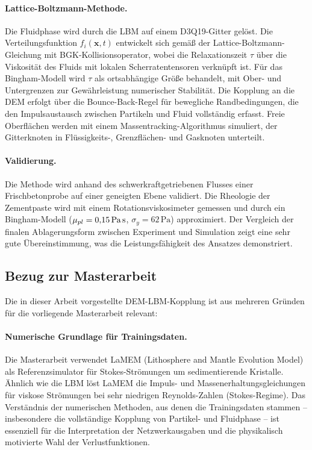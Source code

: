 \documentclass[a4paper,12pt]{article}
\begin{document}
\paragraph{Lattice-Boltzmann-Methode.}
Die Fluidphase wird durch die LBM auf einem D3Q19-Gitter gelöst. Die Verteilungsfunktion $f_i(\mathbf{x}, t)$ entwickelt sich gemäß der Lattice-Boltzmann-Gleichung mit BGK-Kollisionsoperator, wobei die Relaxationszeit $\tau$ über die Viskosität des Fluids mit lokalen Scherratentensoren verknüpft ist. Für das Bingham-Modell wird $\tau$ als ortsabhängige Größe behandelt, mit Ober- und Untergrenzen zur Gewährleistung numerischer Stabilität. Die Kopplung an die DEM erfolgt über die Bounce-Back-Regel für bewegliche Randbedingungen, die den Impulsaustausch zwischen Partikeln und Fluid vollständig erfasst. Freie Oberflächen werden mit einem Massentracking-Algorithmus simuliert, der Gitterknoten in Flüssigkeits-, Grenzflächen- und Gasknoten unterteilt.

\paragraph{Validierung.}
Die Methode wird anhand des schwerkraftgetriebenen Flusses einer Frischbetonprobe auf einer geneigten Ebene validiert. Die Rheologie der Zementpaste wird mit einem Rotationsviskosimeter gemessen und durch ein Bingham-Modell ($\mu_{pl} = 0{,}15\,\text{Pa\,s}$, $\sigma_y = 62\,\text{Pa}$) approximiert. Der Vergleich der finalen Ablagerungsform zwischen Experiment und Simulation zeigt eine sehr gute Übereinstimmung, was die Leistungsfähigkeit des Ansatzes demonstriert.

\subsection*{Bezug zur Masterarbeit}

Die in dieser Arbeit vorgestellte DEM-LBM-Kopplung ist aus mehreren Gründen für die vorliegende Masterarbeit relevant:

\paragraph{Numerische Grundlage für Trainingsdaten.}
Die Masterarbeit verwendet LaMEM (Lithosphere and Mantle Evolution Model) als Referenzsimulator für Stokes-Strömungen um sedimentierende Kristalle. Ähnlich wie die LBM löst LaMEM die Impuls- und Massenerhaltungsgleichungen für viskose Strömungen bei sehr niedrigen Reynolds-Zahlen (Stokes-Regime). Das Verständnis der numerischen Methoden, aus denen die Trainingsdaten stammen -- insbesondere die vollständige Kopplung von Partikel- und Fluidphase -- ist essenziell für die Interpretation der Netzwerkausgaben und die physikalisch motivierte Wahl der Verlustfunktionen.
\end{document}
